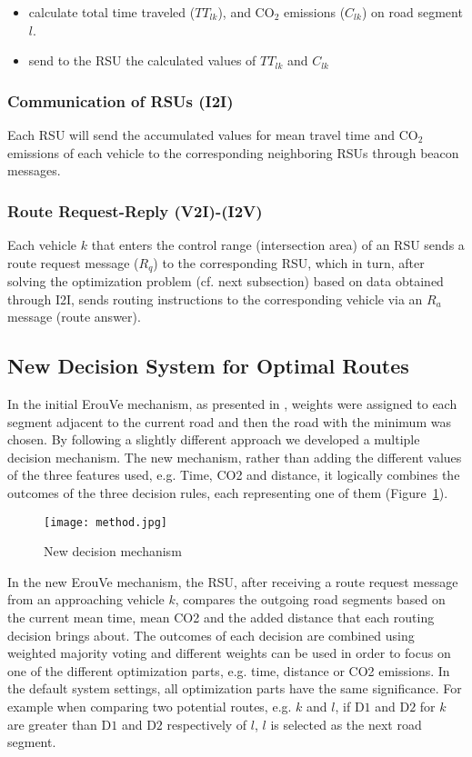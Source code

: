 \documentclass[conference]{IEEEtran}
\begin{document}
\begin{itemize}
\item calculate total time traveled ($TT_{lk}$), and CO$_2$ emissions ($C_{lk}$) on road segment $l$. \item send to the RSU the calculated values of  $TT_{lk}$ and $C_{lk}$
\end{itemize}


\subsubsection{{\bf Communication of RSUs (I2I)}}
Each RSU will send the accumulated values for mean travel time and CO$_2$ emissions of each vehicle to the corresponding neighboring RSUs through beacon messages.


\subsubsection{{\bf Route Request-Reply (V2I)-(I2V)}}
Each vehicle $k$ that enters the control range (intersection area) of an RSU sends a route request message ($R_q$) to the corresponding RSU,
which in turn, after solving the optimization problem (cf. next subsection) based on data obtained through I2I,  sends routing instructions
 to the corresponding vehicle via an $R_a$ message  (route answer).


\subsection{New Decision System for Optimal Routes}
In the initial ErouVe mechanism, as presented in \cite{maglaras2013exploiting}, weights were assigned to each segment adjacent to the current road and then 
the road with the minimum was chosen.
By following  a slightly different approach we developed a multiple decision mechanism. The new mechanism, rather than adding the different values of the three features used, e.g. Time, CO2 and distance, it logically combines the outcomes of the three decision rules, each representing one of them (Figure~\ref{dec-syst}). 
\begin{figure}[!htb]
  \centering
 \texttt{[image: method.jpg]}	
  \caption{New decision mechanism}
  \label{dec-syst}
\end{figure}


In the new ErouVe mechanism, the RSU, after receiving a route request message from an approaching vehicle $k$, compares the outgoing road segments based on the current mean time, mean CO2 and the added distance that each routing decision brings about. The outcomes of each decision are combined using weighted majority  voting and different weights can be used in order to focus on one of the different optimization parts, e.g. time, distance or CO2
emissions. In the default system settings, all optimization parts have the same significance. For example when comparing two potential routes, e.g. $k$ and $l$, if D$1$ and D$2$ for $k$ are greater than D$1$ and D$2$ respectively of $l$, $l$ is selected as the next road segment. 
\end{document}
